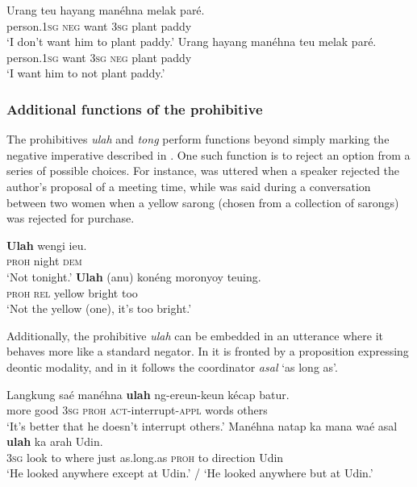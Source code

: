\documentclass[output=paper]{langscibook}
\begin{document}
\ea\label{ex:sun:61}
    \ea\label{ex:sun:61a}
        \gll  Urang teu hayang manéhna melak paré.\\ 
              person.1\textsc{sg} \textsc{neg} want 3\textsc{sg} plant paddy\\
        \glt ‘I don’t want him to plant paddy.’
    \ex\label{ex:sun:61b}
        \gll  Urang hayang manéhna teu melak paré.\\
              person.1\textsc{sg} want 3\textsc{sg} \textsc{neg} plant paddy\\
        \glt ‘I want him to not plant paddy.’ 
    \z
\z 

\subsubsection{Additional functions of the prohibitive}\label{sec:sun:4.6.2}


The prohibitives \textit{ulah} and \textit{tong} perform functions beyond simply marking the negative imperative described in . One such function is to reject an option from a series of possible choices. For instance,  was uttered when a speaker rejected the author’s proposal of a meeting time, while  was said during a conversation between two women when a yellow sarong (chosen from a collection of sarongs) was rejected for purchase. 

\ea\label{ex:sun:62}
    \ea\label{ex:sun:62a}
        \gll  \textbf{Ulah} wengi ieu. \\ 
              \textsc{proh} night \textsc{dem}\\
        \glt ‘Not tonight.’
    \ex\label{ex:sun:62b}
        \gll  \textbf{Ulah} (anu) konéng moronyoy teuing. \\
              \textsc{proh} \textsc{rel} yellow bright too \\
        \glt ‘Not the yellow (one), it’s too bright.’ \citep[152]{Butters2021}
    \z
\z 

Additionally, the prohibitive \textit{ulah} can be embedded in an utterance where it behaves more like a standard negator. In  it is fronted by a proposition expressing deontic modality, and in  it follows the coordinator \textit{asal} ‘as long as’. 

\ea\label{ex:sun:63}
    \ea\label{ex:sun:63a}
        \gll  Langkung saé manéhna \textbf{ulah} ng-ereun-keun kécap batur.\\ 
              more good 3\textsc{sg} \textsc{proh} \textsc{act}{}-interrupt-\textsc{appl} words others\\
        \glt ‘It’s better that he doesn’t interrupt others.’ \citep[155]{Butters2021}
    \ex\label{ex:sun:63b}
        \gll  Manéhna natap ka mana waé asal \textbf{ulah} ka arah Udin. \\
              3\textsc{sg} look to where just as.long.as \textsc{proh} to direction Udin\\
        \glt ‘He looked anywhere except at Udin.’ / ‘He looked anywhere but at Udin.’ \citep[156]{Butters2021}
    \z
\z 
\end{document}
